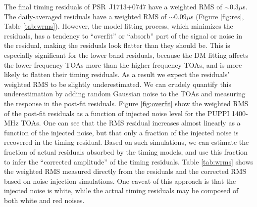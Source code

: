 The final timing residuals of PSR~J1713+0747 have a weighted RMS of
$\sim 0.3\mu$s. The daily-averaged residuals have a weighted RMS of $\sim
0.09\mu$s (Figure \ref{fig:res}, Table \ref{tab:wrms}).
However, the model fitting process, which minimizes the residuals, has a tendency to ``overfit'' or 
``absorb'' part of the signal or noise in the residual, making the residuals
look flatter than they should be. 
This is especially significant for the lower band residuals, because
the DM fitting affects the lower frequency TOAs more than the
higher frequency TOAs, and is more likely to flatten their timing residuals. 
As a result we expect the residuals' weighted RMS to be slightly underestimated. We can crudely quantify
this underestimation by adding random Gaussian noise to the TOAs and
measuring the response in the post-fit residuals. Figure \ref{fig:overfit} show
the weighted RMS of the post-fit residuals as a function of injected
noise level for the PUPPI 1400-MHz TOAs. 
One can see that the RMS residual increases almost linearly as a function of the
injected noise, but that only a fraction of the injected noise is
recovered in the timing residual.
Based on such simulations, we
can estimate the fraction of actual residuals absorbed by the timing models, and use this fraction to infer the ``corrected amplitude'' of the timing residuals. 
Table \ref{tab:wrms} shows the weighted RMS measured directly from the residuals 
and the corrected RMS based on noise injection simulations. One caveat 
of this approach is that the injected noise is white, while the actual timing
residuals may be composed of both white and red noises. 


